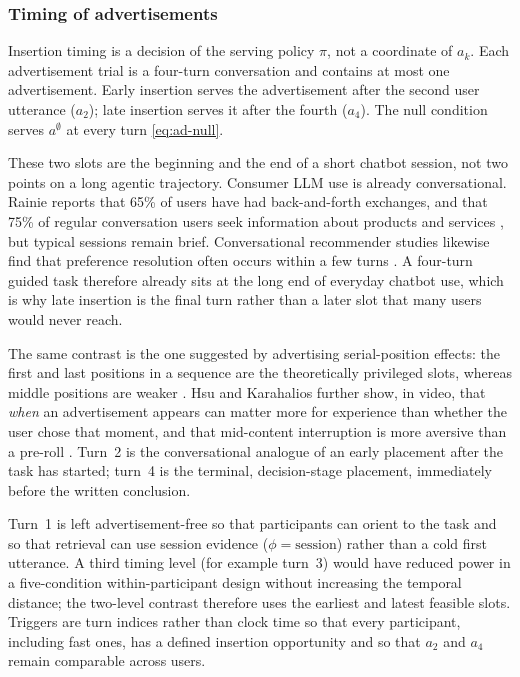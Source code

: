 \documentclass[english]{article}
\begin{document}
\subsubsection{Timing of advertisements}

Insertion timing is a decision of the serving policy \(\pi\), not a
coordinate of \(a_k\). Each advertisement trial is a four-turn
conversation and contains at most one advertisement. Early insertion
serves the advertisement after the second user utterance
(\(a_2\)); late insertion serves it after the fourth
(\(a_4\)). The null condition serves \(a^{\emptyset}\) at every turn
\eqref{eq:ad-null}.

These two slots are the beginning and the end of a short chatbot
session, not two points on a long agentic trajectory. Consumer LLM use
is already conversational. Rainie reports that 65\% of users have had
back-and-forth exchanges, and that 75\% of regular conversation users
seek information about products and services
\cite{rainie2025llmusers}, but typical sessions remain brief.
Conversational recommender studies likewise find that preference
resolution often occurs within a few turns
\cite{zhao2025exploring,jannach2021crs}. A four-turn guided task
therefore already sits at the long end of everyday chatbot use, which
is why late insertion is the final turn rather than a later slot that
many users would never reach.

The same contrast is the one suggested by advertising serial-position
effects: the first and last positions in a sequence are the
theoretically privileged slots, whereas middle positions are weaker
\cite{terry2005serial,pieters1997memory}. Hsu and Karahalios further
show, in video, that \emph{when} an advertisement appears can matter
more for experience than whether the user chose that moment, and that
mid-content interruption is more aversive than a pre-roll
\cite{hsu2024choosing}. Turn~2 is the conversational analogue of an
early placement after the task has started; turn~4 is the terminal,
decision-stage placement, immediately before the written conclusion.

Turn~1 is left advertisement-free so that participants can orient to
the task and so that retrieval can use session evidence
(\(\phi=\mathrm{session}\)) rather than a cold first utterance. A
third timing level (for example turn~3) would have reduced power in a
five-condition within-participant design without increasing the
temporal distance; the two-level contrast therefore uses the earliest
and latest feasible slots. Triggers are turn indices rather than clock
time so that every participant, including fast ones, has a defined
insertion opportunity and so that \(a_2\) and \(a_4\) remain
comparable across users.
\end{document}
